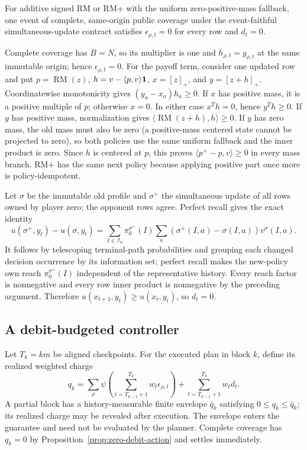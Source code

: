 \begin{proposition}
\label{prop:zero-debit-action}
For additive signed RM or RM+ with the uniform zero-positive-mass fallback,
one event of complete, same-origin public
coverage under the event-faithful simultaneous-update contract satisfies
$\epsilon_{\rho,t}=0$ for every row and $d_t=0$.
\end{proposition}

Complete coverage has $B=N$, so its multiplier is one and
$h_{\rho,t}=g_{\rho,t}$ at the same immutable origin; hence
$\epsilon_{\rho,t}=0$.  For the payoff term, consider one updated row and put
$p=\operatorname{RM}(z)$, $h=v-\langle p,v\rangle\mathbf 1$,
$x=[z]_+$, and $y=[z+h]_+$.  Coordinatewise monotonicity gives
$(y_a-x_a)h_a\ge0$.  If $x$ has positive mass, it is a positive multiple of
$p$; otherwise $x=0$.  In either case $x^Th=0$, hence $y^Th\ge0$.
If $y$ has positive mass, normalization gives
$\langle\operatorname{RM}(z+h),h\rangle\ge0$.  If $y$ has zero mass, the old
mass must also be zero (a positive-mass centered state cannot be projected to
zero), so both policies use the same uniform fallback and the inner product
is zero.  Since $h$ is centered at $p$, this proves
$\langle p^+-p,v\rangle\ge0$ in every mass branch.  RM+ has the same next
policy because applying positive part once more is policy-idempotent.

Let $\sigma$ be the immutable old profile and $\sigma^+$ the simultaneous
update of all rows owned by player zero; the opponent rows agree.  Perfect
recall gives the exact identity
\[
u(\sigma^+,y_t)-u(\sigma,y_t)
=\sum_{I\in\mathcal I_0}\pi_0^{\sigma^+}(I)
 \sum_a(\sigma^+(I,a)-\sigma(I,a))v^\sigma(I,a).
\]
It follows by telescoping terminal-path probabilities and grouping each
changed decision occurrence by its information set; perfect recall makes the
new-policy own reach $\pi_0^{\sigma^+}(I)$ independent of the representative
history.  Every reach factor is nonnegative and every row inner product is
nonnegative by the preceding argument.  Therefore
$u(x_{t+1},y_t)\ge u(x_t,y_t)$, so $d_t=0$.

\subsection{A debit-budgeted controller}

Let $T_k=km$ be aligned checkpoints.  For the executed plan in block $k$,
define its realized weighted charge
\begin{equation}
q_k=
\sum_\rho\psi\!\left(\sum_{t=T_{k-1}+1}^{T_k}
w_t\epsilon_{\rho,t}\right)
+\sum_{t=T_{k-1}+1}^{T_k}w_td_t.
\label{eq:block-charge}
\end{equation}
A partial block has a history-measurable finite envelope $\bar q_k$ satisfying
$0\le q_k\le\bar q_k$; its realized charge may be revealed after execution.
The envelope enters the guarantee and need not be evaluated by the planner.
Complete coverage has $q_k=0$ by
Proposition~\ref{prop:zero-debit-action} and settles immediately.

